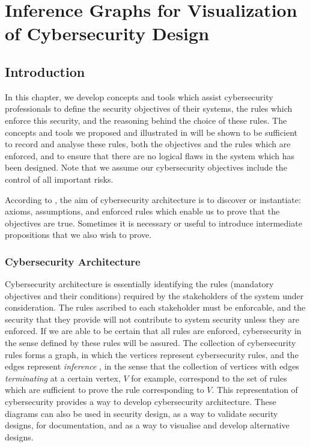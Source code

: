 \chapter{Inference Graphs for Visualization of Cybersecurity Design}\label{Ch5}


\section{Introduction}\label{introsec} \thispagestyle{empty}

In this chapter, we develop concepts and tools which assist cybersecurity professionals to define the security objectives of their systems, the rules which enforce this security, and the reasoning
behind the choice of these rules. The concepts and tools we proposed and illustrated in \cite{sheniar2019Graph} will be shown to be sufficient to record and analyse these rules, both the objectives and the rules which are enforced, and to ensure that there are no logical flaws in the system which has been designed. Note that we assume our cybersecurity objectives include the control of all important risks. 

According to \cite{sheniar2019Graph}, the aim of cybersecurity architecture is to discover or instantiate: axioms, assumptions, and enforced rules which enable us to prove that the objectives are true. Sometimes it is necessary  or useful to introduce intermediate propositions that we also wish to prove.
\subsection{Cybersecurity Architecture}\label{cybarcht}
Cybersecurity architecture is essentially identifying the rules (mandatory objectives and their conditions) required by the stakeholders of the system under consideration.
The rules ascribed to each stakeholder must be enforcable, and the security that they
provide will not contribute to system security unless they are enforced. If we 
are able to be certain that all rules are enforced, cybersecurity in the sense
defined by these rules will be assured. The collection of cybersecurity rules forms a graph, in which the vertices represent cybersecurity rules, and the edges represent {\em inference} \cite{sheniar2019Graph}, in the sense that the collection of vertices with edges {\em terminating} at a certain vertex, $V$ for example, correspond to the set of rules which are sufficient to prove the rule corresponding to $V$. This representation of cybersecurity provides a way to develop cybersecurity architecture. These diagrams can also be used in security design, as a way to validate security designs, for documentation, and as a way to visualise and develop alternative designs.

